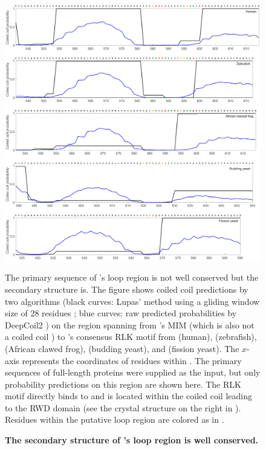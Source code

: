 \begin{figure}
    \centering
    \includegraphics[width=\textwidth]{chapters/figures/MAD1_MIM-RLK_Lupas+DeepCoil2.pdf}
    \caption{\textbf{The secondary structure of 's loop region is well conserved.}}
    \noindent\justifying The primary sequence of 's loop region is not well conserved but the secondary structure is. The figure shows coiled coil predictions by two algorithms (black curves: Lupas' method using a gliding window size of 28 residues \cite{LupasCOILS}; blue curves: raw predicted probabilities by DeepCoil2 \cite{DeepCoil}) on the region spanning from 's MIM (which is also not a coiled coil \cite{Structure1GO4}) to 's consensus RLK motif from  (human),  (zebrafish),  (African clawed frog),  (budding yeast), and  (fission yeast). The $x$-axis represents the coordinates of residues within . The primary sequences of full-length  proteins were supplied as the input, but only probability predictions on this region are shown here. The RLK motif directly binds to  \cite{Ji2017eLife, BUB1CD1-MAD1CStructure} and is located within the coiled coil leading to the RWD domain (see the crystal structure on the right in ). Residues within the putative loop region are colored as in .
    \label{MAD1_MIM-RLK_Lupas+DeepCoil2}
\end{figure}

